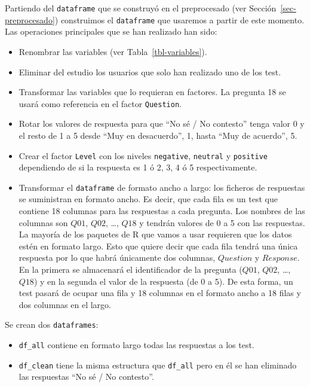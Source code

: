 \documentclass[
  12pt,
  a4paper,
  extrafontsizes,
  onecolumn,
  openright,
  table]{memoir}
\providecommand{\tightlist}{%
  \setlength{\itemsep}{0pt}\setlength{\parskip}{0pt}}\usepackage{longtable,booktabs,array}
\begin{document}
\normalsize

Partiendo del \texttt{dataframe} que se construyó en el preprocesado
(ver Sección~\ref{sec-preprocesado}) construimos el \texttt{dataframe}
que usaremos a partir de este momento. Las operaciones principales que
se han realizado han sido:

\begin{itemize}
\tightlist
\item
  Renombrar las variables (ver Tabla~\ref{tbl-variables}).
\item
  Eliminar del estudio los usuarios que solo han realizado uno de los
  test.
\item
  Transformar las variables que lo requieran en factores. La pregunta 18
  se usará como referencia en el factor \texttt{Question}.
\item
  Rotar los valores de respuesta para que \enquote{No sé / No contesto}
  tenga valor 0 y el resto de 1 a 5 desde \enquote{Muy en desacuerdo},
  1, hasta \enquote{Muy de acuerdo}, 5.
\item
  Crear el factor \texttt{Level} con los niveles \texttt{negative},
  \texttt{neutral} y \texttt{positive} dependiendo de si la respuesta es
  1 ó 2, 3, 4 ó 5 respectivamente.
\item
  Transformar el \texttt{dataframe} de formato ancho a largo: los
  ficheros de respuestas se suministran en formato ancho. Es decir, que
  cada fila es un test que contiene 18 columnas para las respuestas a
  cada pregunta. Los nombres de las columnas son \(Q01\), \(Q02\),
  \ldots, \(Q18\) y tendrán valores de 0 a 5 con las respuestas. La
  mayoría de los paquetes de R que vamos a usar requieren que los datos
  estén en formato largo. Esto que quiere decir que cada fila tendrá una
  única respuesta por lo que habrá únicamente dos columnas, \(Question\)
  y \(Response\). En la primera se almacenará el identificador de la
  pregunta (\(Q01\), \(Q02\), \ldots, \(Q18\)) y en la segunda el valor
  de la respuesta (de 0 a 5). De esta forma, un test pasará de ocupar
  una fila y 18 columnas en el formato ancho a 18 filas y dos columnas
  en el largo.
\end{itemize}

Se crean dos \texttt{dataframes}:

\begin{itemize}
\tightlist
\item
  \texttt{df\_all} contiene en formato largo todas las respuestas a los
  test.
\item
  \texttt{df\_clean} tiene la misma estructura que \texttt{df\_all} pero
  en él se han eliminado las respuestas \enquote{No sé / No contesto}.
\end{itemize}
\end{document}
